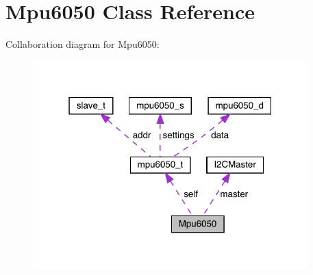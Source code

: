 \hypertarget{classMpu6050}{}\section{Mpu6050 Class Reference}
\label{classMpu6050}


Collaboration diagram for Mpu6050\+:\nopagebreak
\begin{figure}[H]
\begin{center}
\leavevmode
\includegraphics[width=301pt]{classMpu6050__coll__graph}
\end{center}
\end{figure}
